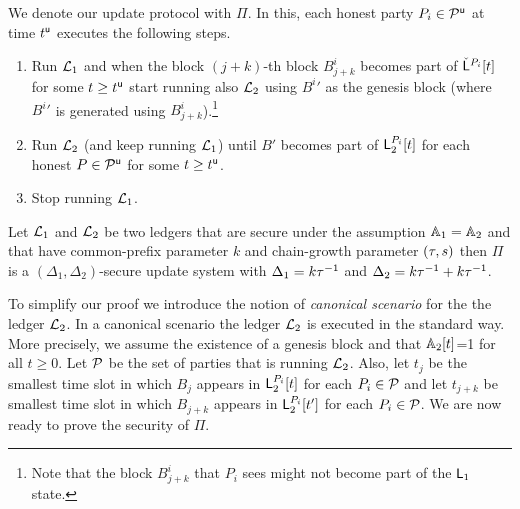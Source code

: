 We denote our update protocol with $\Pi$. In this, each honest party $P_i\in\mathcal{P}^\mathsf{u}$ at time $t^{\mathsf{u}}$ executes the following steps.

\begin{enumerate}
	\item Run $\mathcal{L}_1$ and when the block $(j+k)$-th block $B^i_{j+k}$ becomes part of $\check {\mathsf{L}}^{P_i}[t]$ for some $t\geq t^{\mathsf{u}}$
	start running also $\mathcal{L}_2$ using ${B^i}'$ as the genesis block (where ${B^i}'$ is generated using $B^i_{j+k}$).\footnote{Note that the block
	 $B^i_{j+k}$ that $P_i$ sees might not become part of the $\mathsf{L}_1$ state.}
	\item Run $\mathcal{L}_2$ (and keep running $\mathcal{L}_1$) until $B'$ becomes part of $\mathsf{L}_2^{P_i}[t]$ 
	for each honest $P\in\mathcal{P}^\mathsf{u}$ for some $t\geq t^{\mathsf{u}}$.
	\item Stop running $\mathcal{L}_1$.
\end{enumerate}



\begin{theorem}
Let $\mathcal{L}_1$ and $\mathcal{L}_2$ be two ledgers that are secure under the assumption $\mathbb{A}_1=\mathbb{A}_2$ and
that have common-prefix parameter $k$ and chain-growth parameter $(\tau, s)$ then
 $\Pi$ is a $(\Delta_1,\Delta_2)$-secure update system with $\Delta_1=k\tau^{-1}$ and $\Delta_2=k \tau^{-1} + k \tau^{-1}$.
\end{theorem}

To simplify our proof we introduce the notion of \emph{canonical scenario} for the the ledger $\mathcal{L}_2$. In a canonical scenario the ledger
$\mathcal{L}_2$ is executed in the standard way. More precisely, 
we assume the existence of a genesis block and that $\mathbb{A}_2[t]$=1 for all $t\geq 0$. Let $\mathcal{P}$ be the set of parties that is running $\mathcal{L}_2$. Also, 
let $t_j$ be the smallest time slot in which $B_j$ appears in $\mathsf{L}_2^{P_i}[t]$ for each $P_i\in\mathcal{P}$ and let $t_{j+k}$ be smallest time slot in which $B_{j+k}$ appears in 
$\mathsf{L}_2^{P_i}[t']$ for each $P_i\in\mathcal{P}$.
We are now ready to prove the security of $\Pi$.


